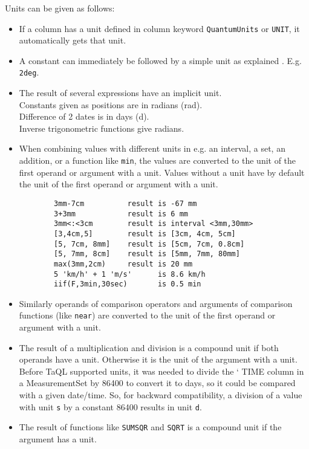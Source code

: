 Units can be given as follows:
\begin{itemize}
 \item If a column has a unit defined in column keyword
	\texttt{QuantumUnits} or \texttt{UNIT}, it automatically
	gets that unit.
 \item A constant can immediately be followed by a simple unit as
	explained .
	E.g. \texttt{2deg}.
 \item The result of several expressions have an implicit unit.
	\\Constants given as positions are in radians (rad).
	\\Difference of 2 dates is in days (d).
	\\Inverse trigonometric functions give radians.
 \item When combining values with different units in e.g. an interval,
	a set, an addition, or a function like \texttt{min}, the values
	are converted to the unit of the first operand or argument
	with a unit. Values without a unit have by default the unit
	of the first operand or argument with a unit.
	\begin{verbatim}
        3mm-7cm          result is -67 mm
        3+3mm            result is 6 mm
        3mm<:<3cm        result is interval <3mm,30mm>
        [3,4cm,5]        result is [3cm, 4cm, 5cm]
        [5, 7cm, 8mm]    result is [5cm, 7cm, 0.8cm]
        [5, 7mm, 8cm]    result is [5mm, 7mm, 80mm]
        max(3mm,2cm)     result is 20 mm
        5 'km/h' + 1 'm/s'      is 8.6 km/h
        iif(F,3min,30sec)       is 0.5 min
	\end{verbatim}
 \item Similarly operands of comparison operators and arguments of
	comparison functions (like \texttt{near}) are converted to
	the unit of the first operand or argument with a unit.
 \item The result of a multiplication and division is a compound unit
	if both operands have a unit. Otherwise it is the unit of
	the argument with a unit.
        \\Before TaQL supported units, it was needed to divide the
`	TIME column in a MeasurementSet by 86400 to convert it to
	days, so it could be compared with a given date/time.
	So, for backward compatibility, a division of a value with
	unit \texttt{s} by a constant 86400 results in unit \texttt{d}.
 \item The result of functions like \texttt{SUMSQR} and \texttt{SQRT} is a
	compound unit if the argument has a unit.

\end{itemize}
